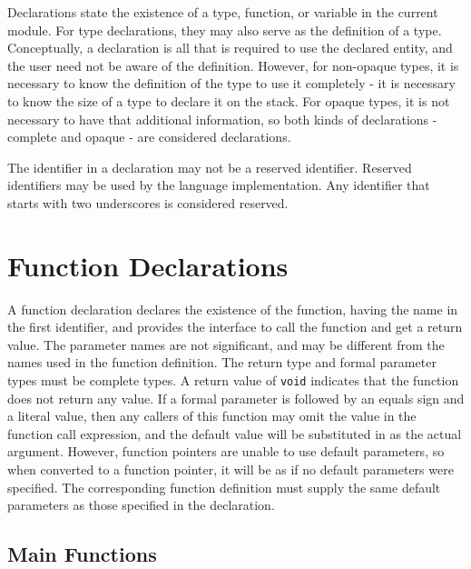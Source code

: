 \documentclass[letterpaper,12pt]{book}
\begin{document}


Declarations state the existence of a type, function, or variable in the current module. For type declarations, they may also serve as the definition of a type. Conceptually, a declaration is all that is required to use the declared entity, and the user need not be aware of the definition. However, for non-opaque types, it is necessary to know the definition of the type to use it completely - it is necessary to know the size of a type to declare it on the stack. For opaque types, it is not necessary to have that additional information, so both kinds of declarations - complete and opaque - are considered declarations.

The identifier in a declaration may not be a reserved identifier. Reserved identifiers may be used by the language implementation. Any identifier that starts with two underscores is considered reserved.

\section{Function Declarations}\label{section:Function Declarations}



A function declaration declares the existence of the function, having the name in the first identifier, and provides the interface to call the function and get a return value. The parameter names are not significant, and may be different from the names used in the function definition. The return type and formal parameter types must be complete types. A return value of \texttt{void} indicates that the function does not return any value. If a formal parameter is followed by an equals sign and a literal value, then any callers of this function may omit the value in the function call expression, and the default value will be substituted in as the actual argument. However, function pointers are unable to use default parameters, so when converted to a function pointer, it will be as if no default parameters were specified. The corresponding function definition must supply the same default parameters as those specified in the declaration.

\subsection{Main Functions}
\end{document}
